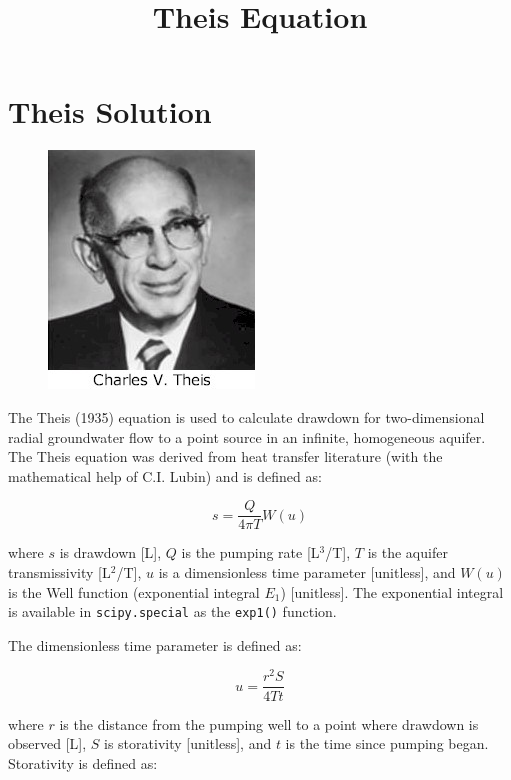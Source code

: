 \documentclass[11pt, oneside]{article}   	%
\title{Theis Equation}
\begin{document}
\maketitle



\section{Theis Solution}

\begin{figure}[htbp]
   \centering
   \includegraphics[scale=0.5]{./images/theis_charles_vernon.jpg} %
   \label{fig:theis}
\end{figure}

The Theis (1935) equation is used to calculate drawdown for two-dimensional radial groundwater flow to a point source in an infinite, homogeneous aquifer. The Theis equation was derived from heat transfer literature (with the mathematical help of C.I. Lubin) and is defined as:

\begin{equation}
s = \frac{Q}{4 \pi T} W(u)
\end{equation}

\noindent where $s$ is drawdown [L], $Q$ is the pumping rate [L$^3$/T], $T$ is the aquifer transmissivity [L$^2$/T], $u$ is a dimensionless time parameter [unitless], and $W(u)$ is the Well function (exponential integral $E_1$) [unitless]. The exponential integral is available in \texttt{scipy.special} as the \texttt{exp1()} function.

The dimensionless time parameter is defined as:

\begin{equation}
u = \frac{r^2S}{4Tt}
\end{equation}

\noindent where $r$ is the distance from the pumping well to a point where drawdown is observed [L], $S$ is storativity [unitless], and $t$ is the time since pumping began. Storativity is defined as:
\end{document}
